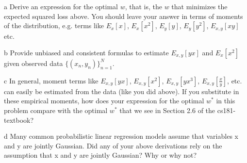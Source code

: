 \documentclass[expanded]{lkx_pset}
\begin{document}
\begin{parts}
  \begin{part}{a}
    Derive an expression for the optimal $w$, that is, the $w$
    that minimizes the expected squared loss above.  You should leave
    your answer in terms of moments of the distribution, e.g. terms
    like $E_x[x]$, $E_x[x^2]$, $E_y[y]$, $E_y[y^2]$, $E_{x,y}[xy]$
    etc.
  \end{part}

  \begin{part}{b}
    Provide unbiased and consistent formulas to estimate $E_{x, y}[yx]$
   and $E_x[x^2]$ given observed data $\{(x_n,y_n)\}_{n=1}^N$.
  \end{part}

  \begin{part}{c} In general, moment terms like $E_{x, y}[yx]$, $E_{x, y}[x^2]$,
    $E_{x, y}[yx^3]$, $E_{x, y}[\frac{x}{y}]$, etc. can easily be
    estimated from the data (like you did above).  If you substitute in
    these empirical moments, how does your expression for the optimal
    $w^*$ in this problem compare with the optimal $w^*$ that we see in
    Section 2.6 of the cs181-textbook?
  \end{part}

  \begin{part}{d}
    Many common probabilistic linear regression models assume that
    variables x and y are jointly Gaussian.  Did any of your above
    derivations rely on the assumption that x and y are jointly
    Gaussian?  Why or why not?
  \end{part}
\end{parts}
\end{document}
